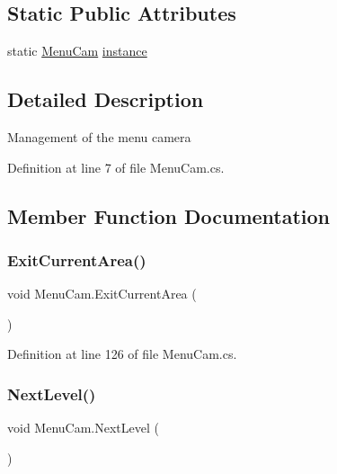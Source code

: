 \subsection*{Static Public Attributes}
\begin{DoxyCompactItemize}
\item 
static \mbox{\hyperlink{class_menu_cam}{Menu\+Cam}} \mbox{\hyperlink{class_menu_cam_a919ea6a55394f24a933eb1137fa62088}{instance}}
\end{DoxyCompactItemize}


\subsection{Detailed Description}
Management of the menu camera 



Definition at line 7 of file Menu\+Cam.\+cs.



\subsection{Member Function Documentation}
\mbox{\label{class_menu_cam_a95f4d4c1cace6c102e38e60d937abd1e}} 
\subsubsection{\texorpdfstring{Exit\+Current\+Area()}{ExitCurrentArea()}}
{\footnotesize\ttfamily void Menu\+Cam.\+Exit\+Current\+Area (\begin{DoxyParamCaption}{ }\end{DoxyParamCaption})}



Definition at line 126 of file Menu\+Cam.\+cs.

\mbox{\label{class_menu_cam_a3a0722e7dad7bda1a88162fc7d4f9b6d}} 
\subsubsection{\texorpdfstring{Next\+Level()}{NextLevel()}}
{\footnotesize\ttfamily void Menu\+Cam.\+Next\+Level (\begin{DoxyParamCaption}{ }\end{DoxyParamCaption})}



